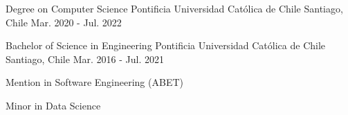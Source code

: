 

\begin{cventries}

  \cventry
  {Degree on Computer Science} %
  {Pontificia Universidad Católica de Chile} %
  {Santiago, Chile} %
  {Mar. 2020 - Jul. 2022} %
  {}

  \cventry
  {Bachelor of Science in Engineering} %
  {Pontificia Universidad Católica de Chile} %
  {Santiago, Chile} %
  {Mar. 2016 - Jul. 2021} %
  {
    \begin{cvitems} %
      \item {Mention in Software Engineering (ABET)}
      \item {Minor in Data Science}
    \end{cvitems}
  }

\end{cventries}
